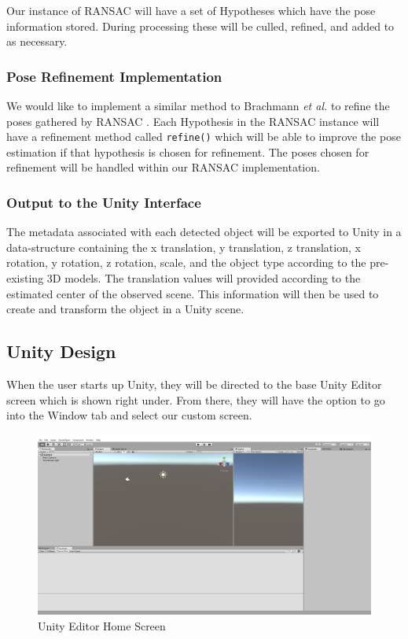 \documentclass[12pt]{article}
\begin{document}
Our instance of RANSAC will have a set of Hypotheses which have the pose
information stored. During processing these will be culled, refined, and
added to as necessary.

\subsubsection{Pose Refinement
Implementation}\label{pose-refinement-implementation}

We would like to implement a similar method to Brachmann \emph{et al.}
to refine the poses gathered by RANSAC \autocite{brachmann}. Each
Hypothesis in the RANSAC instance will have a refinement method called
\texttt{refine()} which will be able to improve the pose estimation if
that hypothesis is chosen for refinement. The poses chosen for
refinement will be handled within our RANSAC implementation.

\subsubsection{Output to the Unity
Interface}\label{output-to-the-unity-interface}

The metadata associated with each detected object will be exported to
Unity in a data-structure containing the x translation, y translation, z
translation, x rotation, y rotation, z rotation, scale, and the object
type according to the pre-existing 3D models. The translation values
will provided according to the estimated center of the observed scene.
This information will then be used to create and transform the object in
a Unity scene.

\subsection{Unity Design}\label{unity-design}

When the user starts up Unity, they will be directed to the base Unity
Editor screen which is shown right under. From there, they will have the
option to go into the Window tab and select our custom screen.

\begin{figure}
\centering
\includegraphics{Pictures/UnityHomeScreen.png}
\caption{Unity Editor Home Screen}
\end{figure}
\end{document}
